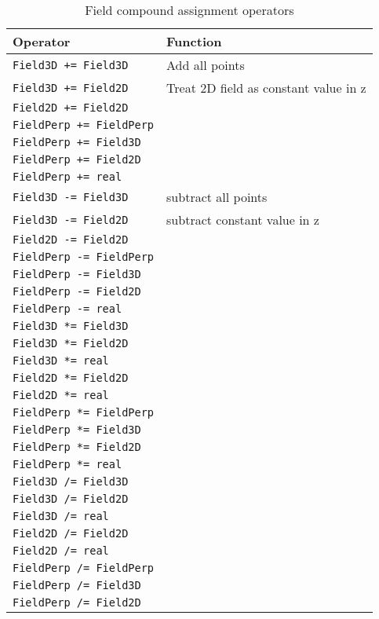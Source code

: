 \documentclass[12pt, a4paper]{article}
\newcommand{\code}[1]{\texttt{#1}}
\begin{document}
\begin{table}[h]
\centering
\caption{Field compound assignment operators} \label{tab:field_cop}
\begin{tabular}[]{ll}
\hline
\hline
Operator & Function \\
\hline
\code{Field3D += Field3D} & Add all points \\
\code{Field3D += Field2D} & Treat 2D field as constant value in z \\
\code{Field2D += Field2D} & \\
\code{FieldPerp += FieldPerp} & \\
\code{FieldPerp += Field3D} & \\
\code{FieldPerp += Field2D} & \\
\code{FieldPerp += real} & \\
\hline
\code{Field3D -= Field3D} & subtract all points \\
\code{Field3D -= Field2D} & subtract constant value in z \\
\code{Field2D -= Field2D} & \\
\code{FieldPerp -= FieldPerp} & \\
\code{FieldPerp -= Field3D} & \\
\code{FieldPerp -= Field2D} & \\
\code{FieldPerp -= real} & \\
\hline
\code{Field3D *= Field3D} & \\
\code{Field3D *= Field2D} & \\
\code{Field3D *= real} & \\
\code{Field2D *= Field2D} & \\
\code{Field2D *= real} & \\
\code{FieldPerp *= FieldPerp} & \\
\code{FieldPerp *= Field3D} & \\
\code{FieldPerp *= Field2D} & \\
\code{FieldPerp *= real} & \\
\hline
\code{Field3D /= Field3D} & \\
\code{Field3D /= Field2D} & \\
\code{Field3D /= real} & \\
\code{Field2D /= Field2D} & \\
\code{Field2D /= real} & \\
\code{FieldPerp /= FieldPerp} & \\
\code{FieldPerp /= Field3D} & \\
\code{FieldPerp /= Field2D} & \\

\end{tabular}
\end{table}
\end{document}
